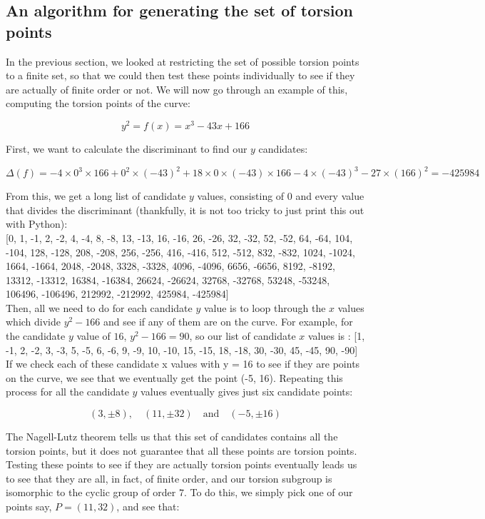 \documentclass{article}
\begin{document}
\subsection{An algorithm for generating the set of torsion points}

In the previous section, we looked at restricting the set of possible torsion points to a finite set, so that we could then test these points individually to see if they are actually of finite order or not. We will now go through an example of this, computing the torsion points of the curve:

\[y^2 = f(x) = x^3 - 43 x + 166\]

First, we want to calculate the discriminant to find our $y$ candidates:

\[\Delta(f) =  -4 \times 0^3 \times 166 + 0^2 \times (-43)^2 + 18 \times 0 \times (-43) \times 166 - 4 \times (-43)^3 - 27 \times (166)^2 = -425984\]

From this, we get a long list of candidate $y$ values, consisting of 0 and every value that divides the discriminant (thankfully, it is not too tricky to just print this out with Python):\\

[0, 1, -1, 2, -2, 4, -4, 8, -8, 13, -13, 16, -16, 26, -26, 32, -32, 52, -52, 64, -64, 104, -104, 128, -128, 208, -208, 256, -256, 416, -416, 512, -512, 832, -832, 1024, -1024, 1664, -1664, 2048, -2048, 3328, -3328, 4096, -4096, 6656, -6656, 8192, -8192, 13312, -13312, 16384, -16384, 26624, -26624, 32768, -32768, 53248, -53248, 106496, -106496, 212992, -212992, 425984, -425984]\\

Then, all we need to do for each candidate $y$ value is to loop through the $x$ values which divide $y^2 - 166$ and see if any of them are on the curve. For example, for the candidate $y$ value of $16$, $y^2 - 166 = 90$, so our list of candidate $x$ values is : [1, -1, 2, -2, 3, -3, 5, -5, 6, -6, 9, -9, 10, -10, 15, -15, 18, -18, 30, -30, 45, -45, 90, -90] If we check each of these candidate x values with y = 16 to see if they are points on the curve, we see that we eventually get the point (-5, 16). Repeating this process for all the candidate $y$ values eventually  gives just six candidate points:

\[(3, \pm 8), \quad (11, \pm 32) \quad \text{and} \quad (-5, \pm 16)\]

The Nagell-Lutz theorem tells us that this set of candidates contains all the torsion points, but it does not guarantee that all these points are torsion points. Testing these points to see if they are actually torsion points eventually leads us to see that they are all, in fact, of finite order, and our torsion subgroup is isomorphic to the cyclic group of order $7$. To do this, we simply pick one of our points say, $P = (11, 32)$, and see that:
\end{document}
